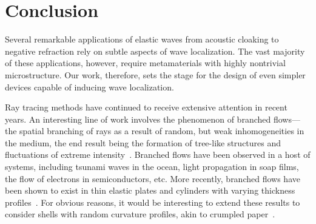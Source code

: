 
\chapter{Conclusion}

Several remarkable applications of elastic waves from acoustic cloaking to negative refraction rely on subtle aspects of wave localization.
The vast majority of these applications, however, require metamaterials with highly nontrivial microstructure.
Our work, therefore, sets the stage for the design of even simpler devices capable of inducing wave localization.

Ray tracing methods have continued to receive extensive attention in recent years.
An interesting line of work involves the phenomenon of branched flows---the spatial branching of rays as a result of random, but weak inhomogeneities in the medium, the end result being the formation of tree-like structures and fluctuations of extreme intensity~\cite{heller2021}.
Branched flows have been observed in a host of systems, including tsunami waves in the ocean, light propagation in soap films, the flow of electrons in semiconductors, etc.
More recently, branched flows have been shown to exist in thin elastic plates and cylinders with varying thickness profiles~\cite{jose2022,jose2023}.
For obvious reasons, it would be interesting to extend these results to consider shells with random curvature profiles, akin to crumpled paper~\cite{gopinathan2002}.

